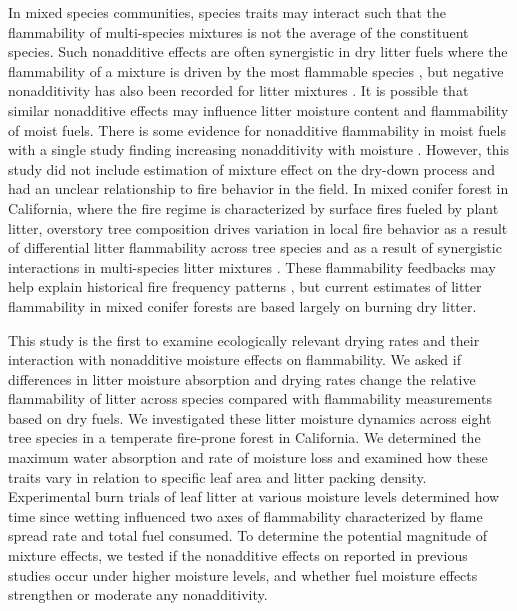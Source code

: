 \documentclass[letterpaper,12pt]{article}
\begin{document}
In mixed species communities, species traits may interact such that the
flammability of multi-species mixtures is not the average of the constituent
species. Such nonadditive effects are often synergistic in dry litter fuels
where the flammability of a mixture is driven by the most flammable species
\citep{VanAltena+Logtestjin+etal-2012, Magalhaes+Schwilk-2012}, but negative
nonadditivity has also been recorded for litter mixtures
\citep{Blauw+Wensink+etal-2015, Zhao+vanLogtestijn+etal-2019}. It is possible
that similar nonadditive effects may influence litter moisture content and
flammability of moist fuels. There is some evidence for nonadditive
flammability in moist fuels with a single study finding increasing
nonadditivity with moisture \citep{Blauw+Wensink+etal-2015}. However, this study
did not include estimation of mixture effect on the dry-down process and
had an unclear relationship to fire behavior in the field. In mixed conifer
forest in California, where the fire regime is characterized by surface fires
fueled by plant litter, overstory tree composition drives variation in local
fire behavior \citep{Schwilk+Caprio-2011} as a result of differential litter
flammability across tree species and as a result of synergistic interactions in
multi-species litter mixtures \citep{Magalhaes+Schwilk-2012}. These
flammability feedbacks may help explain historical fire frequency patterns
\citep{Schwilk+Caprio-2011}, but current estimates of litter flammability in
mixed conifer forests are based largely on burning dry litter.

This study is the first to examine ecologically relevant drying rates and their
interaction with nonadditive moisture effects on flammability. We asked if
differences in litter moisture absorption and drying rates change the
relative flammability of litter across species compared with flammability
measurements based on dry fuels. We investigated these litter moisture dynamics
across eight tree species in a temperate fire-prone forest in California. We
determined the maximum water absorption and rate of moisture loss and examined
how these traits vary in relation to specific leaf area and litter packing
density. Experimental burn trials of leaf litter at various moisture levels
determined how time since wetting influenced two axes of flammability
characterized by flame spread rate and total fuel consumed. To determine the
potential magnitude of mixture effects, we tested if the nonadditive effects on
reported in previous studies occur under higher moisture levels, and whether
fuel moisture effects strengthen or moderate any nonadditivity.
\end{document}
